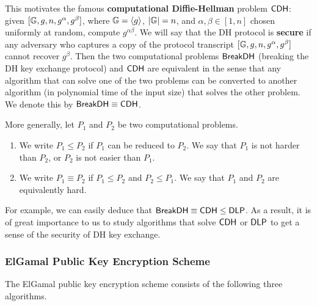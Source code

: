 This motivates the famous {\bf computational Diffie-Hellman} problem ${\sf CDH}$: given 
$[\mathbb{G}, g, n, g^\alpha, g^\beta]$, where $\mathbb{G} = \langle g \rangle$, $|\mathbb{G}| = n$, 
and $\alpha, \beta \in [1, n]$ chosen uniformly at random, compute $g^{\alpha\beta}$. 
We will say that the DH protocol is {\bf secure} if any adversary who captures a 
copy of the protocol transcript $[\mathbb{G}, g, n, g^\alpha, g^\beta]$ cannot recover 
$g^\beta$. Then the two computational problems ${\sf BreakDH}$ (breaking the DH 
key exchange protocol) and ${\sf CDH}$ are equivalent in the sense that any algorithm 
that can solve one of the two problems can be converted to another algorithm 
(in polynomial time of the input size) that solves the other problem. We denote this 
by ${\sf BreakDH} \equiv {\sf CDH}$. 

More generally, let $P_1$ and $P_2$ be two computational problems. 
\begin{enumerate}[(1)]
    \item We write $P_1 \leq P_2$ if $P_1$ can be reduced to $P_2$. We say that 
          $P_1$ is not harder than $P_2$, or $P_2$ is not easier than $P_1$. 
    \item We write $P_1 \equiv P_2$ if $P_1 \leq P_2$ and $P_2 \leq P_1$. 
          We say that $P_1$ and $P_2$ are equivalently hard. 
\end{enumerate}

For example, we can easily deduce that ${\sf BreakDH} \equiv {\sf CDH} \leq {\sf DLP}$. 
As a result, it is of great importance to us to study algorithms that solve 
${\sf CDH}$ or ${\sf DLP}$ to get a sense of the security of DH key exchange. 

\subsubsection{ElGamal Public Key Encryption Scheme}
The ElGamal public key encryption scheme consists of the following three algorithms. 

